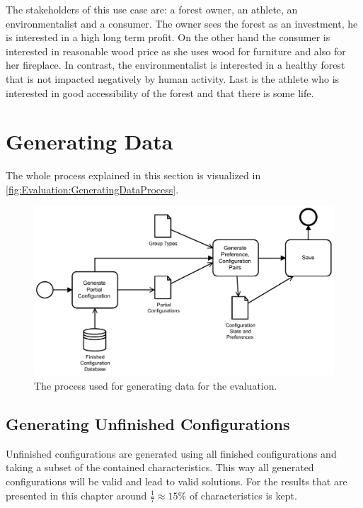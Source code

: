 The stakeholders of this use case are: a forest owner, an athlete, an environmentalist and a consumer. The owner sees the forest as an investment, he is interested in a high long term profit. On the other hand the consumer is interested in reasonable wood price as she uses wood for furniture and also for her fireplace. In contrast, the environmentalist is interested in a healthy forest that is not impacted negatively by human activity. Last is the athlete who is interested in good accessibility of the forest and that there is some life.  

\section{Generating Data}
\label{sec:Evaluation:GeneratingGroups}

The whole process explained in this section is visualized in \autoref{fig:Evaluation:GeneratingDataProcess}.

\begin{figure}
    \centering
    \includegraphics[width=1\textwidth]{./figures/60_evaluation/bpmn_evaluation_input_data_generation.pdf}
    \caption{The process used for generating data for the evaluation.}
    \label{fig:Evaluation:GeneratingDataProcess}
\end{figure}

\subsection{Generating Unfinished Configurations}

Unfinished configurations are generated using all finished configurations and taking a subset of the contained characteristics. This way all generated configurations will be valid and lead to valid solutions. For the results that are presented in this chapter around $\frac{1}{7} \approx 15\%$ of characteristics is kept.

